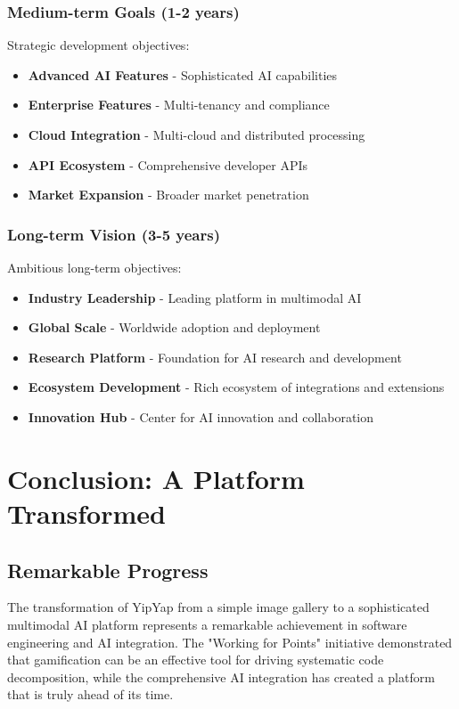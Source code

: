 \documentclass[11pt]{article}
\begin{document}
\subsubsection{Medium-term Goals (1-2 years)}

Strategic development objectives:

\begin{itemize}
\item \textbf{Advanced AI Features} - Sophisticated AI capabilities
\item \textbf{Enterprise Features} - Multi-tenancy and compliance
\item \textbf{Cloud Integration} - Multi-cloud and distributed processing
\item \textbf{API Ecosystem} - Comprehensive developer APIs
\item \textbf{Market Expansion} - Broader market penetration
\end{itemize}

\subsubsection{Long-term Vision (3-5 years)}

Ambitious long-term objectives:

\begin{itemize}
\item \textbf{Industry Leadership} - Leading platform in multimodal AI
\item \textbf{Global Scale} - Worldwide adoption and deployment
\item \textbf{Research Platform} - Foundation for AI research and development
\item \textbf{Ecosystem Development} - Rich ecosystem of integrations and extensions
\item \textbf{Innovation Hub} - Center for AI innovation and collaboration
\end{itemize}

\section{Conclusion: A Platform Transformed}

\subsection{Remarkable Progress}

The transformation of YipYap from a simple image gallery to a sophisticated multimodal AI platform represents a remarkable achievement in software engineering and AI integration. The "Working for Points" initiative demonstrated that gamification can be an effective tool for driving systematic code decomposition, while the comprehensive AI integration has created a platform that is truly ahead of its time.
\end{document}
